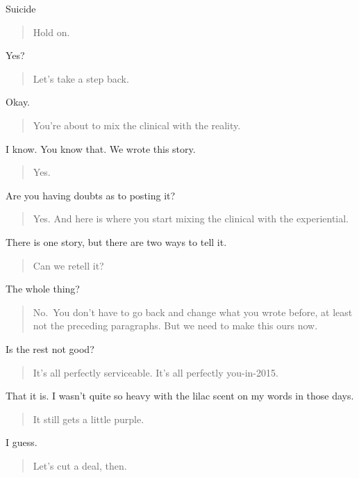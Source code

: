 Suicide

\begin{quote}
Hold on.
\end{quote}

Yes?

\begin{quote}
Let's take a step back.
\end{quote}

Okay.

\begin{quote}
You're about to mix the clinical with the reality.
\end{quote}

I know. You know that. We wrote this story.

\begin{quote}
Yes.
\end{quote}

Are you having doubts as to posting it?

\begin{quote}
Yes. And here is where you start mixing the clinical with the experiential.
\end{quote}

There is one story, but there are two ways to tell it.

\begin{quote}
Can we retell it?
\end{quote}

The whole thing?

\begin{quote}
No.~You don't have to go back and change what you wrote before, at least not the preceding paragraphs. But we need to make this ours now.
\end{quote}

Is the rest not good?

\begin{quote}
It's all perfectly serviceable. It's all perfectly you-in-2015.
\end{quote}

That it is. I wasn't quite so heavy with the lilac scent on my words in those days.

\begin{quote}
It still gets a little purple.
\end{quote}

I guess.

\begin{quote}
Let's cut a deal, then.
\end{quote}

